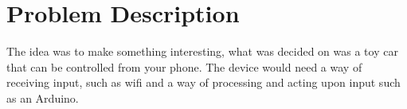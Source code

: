 \section{Problem Description}
\par
The idea was to make something interesting, what was decided on was a toy car that can be controlled from your phone. The device would need a way of receiving input, such as wifi and a way of processing and acting upon input such as an Arduino.
